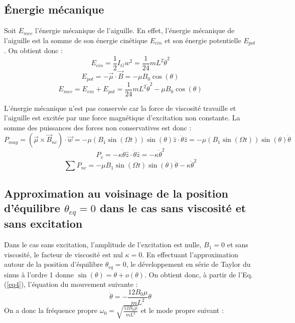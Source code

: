 \documentclass[a4paper,12pt,twoside]{article}
\begin{document}
\subsection{Énergie mécanique}

Soit $E_{mec}$ l'énergie mécanique de l'aiguille. En effet, l'énergie mécanique de l'aiguille est la somme de son énergie cinétique $E_{cin}$ et son énergie potentielle $E_{pot}$. On obtient donc :\\
\[
E_{cin} = \displaystyle\frac{1}{2}I_Gw^2=\displaystyle\frac{1}{24}mL^2\dot{\theta}^2
\]
\[
E_{pot}=-\vec{\mu}\cdot\vec{B}=-\mu B_0\cos(\theta)
\]
\begin{equation}
  E_{mec} =  E_{cin} +E_{pot} =\displaystyle\frac{1}{24}mL^2\dot{\theta}^2 -\mu B_0\cos(\theta)
\end{equation}

L'énergie mécanique n'est pas conservée car la force de viscosité travaille et l'aiguille est excitée par une force magnétique d'excitation non constante. La somme des puissances des forces non conservatives est donc :\\
\[
P_{mag}=(\vec{\mu}\times\vec{B}_{nc})\cdot{\vec{w}}=-\mu (B_1\sin(\Omega t))\sin(\theta)\hat{z}\cdot\dot{\theta}\hat{z}=-\mu (B_1\sin(\Omega t))\sin(\theta)\dot{\theta}
\]
\[
P_{v}=- \kappa\dot{\theta}\hat{z}\cdot\dot{\theta}\hat{z}=- \kappa\dot{\theta}^2
\]
\begin{equation}
\sum P_{nc} = -\mu B_1\sin(\Omega t)\sin(\theta)\dot{\theta} - \kappa\dot{\theta}^2
\end{equation}

\subsection{Approximation au voisinage de la position d'équilibre $\theta_{eq}=0$ dans le cas sans viscosité et sans excitation}

Dans le cas sans excitation, l'amplitude de l'excitation est nulle, $B_1 = 0$ et sans viscosité, le facteur de viscosité est nul $\kappa = 0$. En effectuant l'approximation autour de la position d'équilibre $\theta_{eq} = 0$, le développement en série de Taylor du sinus à l'ordre 1 donne $\sin(\theta) = \theta + o(\theta)$. On obtient donc, à partir de l'Eq.(\ref{eq4}), l'équation du mouvement suivante :
\begin{equation}
    \ddot{\theta} = -\displaystyle\frac{12B_0\mu}{mL^2}\theta
\end{equation}
On a donc la fréquence propre $\omega_0=\displaystyle\sqrt{\frac{12B_0\mu}{mL^2}}$ et le mode propre suivant :\\
\end{document}
